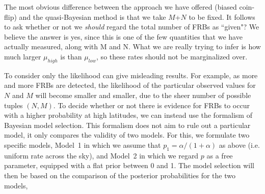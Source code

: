 \documentclass[useAMS,usenatbib]{mn2e}
\begin{document}




The most obvious difference between the approach we have offered (biased coin-flip) 
and the quasi-Bayesian method is that we take $M$+$N$ to be fixed. It follows to ask 
whether or not we \textit{should} regard the total number of FRBs as ``given"? 
We believe the answer is yes, since this is one of the few quantities that we 
have actually measured, along with M and N. What we are really trying 
to infer is how much larger $\mu_{high}$ is than $\mu_{low}$, so these 
rates should not be marginalized over. 

To consider only the likelihood can give misleading results. 
For example, as more and more FRBs are detected, the 
likelihood of the particular observed values for $N$ and $M$ 
will become smaller and smaller, due to the sheer number of 
possible tuples $(N,M)$.
To decide whether or not there is evidence for FRBs to occur with a 
higher probability at high latitudes, we can instead use the formalism 
of Bayesian model selection. This formalism does not aim to rule out a
particular model, it only compares the validity of two models. 
For this, we formulate two specific models, Model~1 in which we
assume that $p_1=\alpha/(1+\alpha)$ as above (i.e. uniform rate across the sky), and Model~2 in 
which we regard $p$ as a free parameter, equipped with a flat prior 
between 0 and 1. The model selection will then be based on the comparison
of the posterior probabilities for the two models,
   
\end{document}
